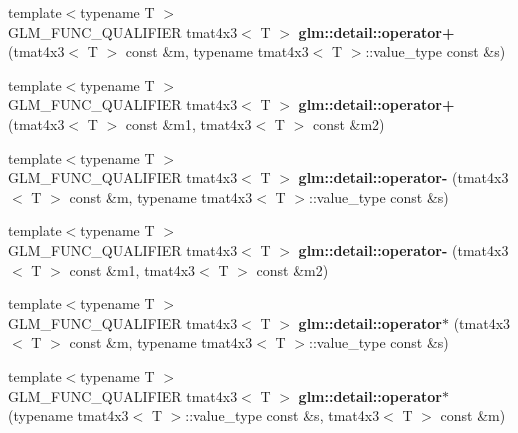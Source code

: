 \begin{DoxyCompactItemize}
\item 
\hypertarget{namespaceglm_1_1detail_a7254d84728b7156831f048a23e82ba5f}{{\footnotesize template$<$typename T $>$ }\\G\-L\-M\-\_\-\-F\-U\-N\-C\-\_\-\-Q\-U\-A\-L\-I\-F\-I\-E\-R tmat4x3$<$ T $>$ {\bfseries glm\-::detail\-::operator+} (tmat4x3$<$ T $>$ const \&m, typename tmat4x3$<$ T $>$\-::value\-\_\-type const \&s)}\label{namespaceglm_1_1detail_a7254d84728b7156831f048a23e82ba5f}

\item 
\hypertarget{namespaceglm_1_1detail_a7fc7624088b1bb5bf684a4dbc9ff79cf}{{\footnotesize template$<$typename T $>$ }\\G\-L\-M\-\_\-\-F\-U\-N\-C\-\_\-\-Q\-U\-A\-L\-I\-F\-I\-E\-R tmat4x3$<$ T $>$ {\bfseries glm\-::detail\-::operator+} (tmat4x3$<$ T $>$ const \&m1, tmat4x3$<$ T $>$ const \&m2)}\label{namespaceglm_1_1detail_a7fc7624088b1bb5bf684a4dbc9ff79cf}

\item 
\hypertarget{namespaceglm_1_1detail_a185d2953b132fd46f6c99f89a5d90ca5}{{\footnotesize template$<$typename T $>$ }\\G\-L\-M\-\_\-\-F\-U\-N\-C\-\_\-\-Q\-U\-A\-L\-I\-F\-I\-E\-R tmat4x3$<$ T $>$ {\bfseries glm\-::detail\-::operator-\/} (tmat4x3$<$ T $>$ const \&m, typename tmat4x3$<$ T $>$\-::value\-\_\-type const \&s)}\label{namespaceglm_1_1detail_a185d2953b132fd46f6c99f89a5d90ca5}

\item 
\hypertarget{namespaceglm_1_1detail_ab7c000595e2d011c003fa5419cc21a5d}{{\footnotesize template$<$typename T $>$ }\\G\-L\-M\-\_\-\-F\-U\-N\-C\-\_\-\-Q\-U\-A\-L\-I\-F\-I\-E\-R tmat4x3$<$ T $>$ {\bfseries glm\-::detail\-::operator-\/} (tmat4x3$<$ T $>$ const \&m1, tmat4x3$<$ T $>$ const \&m2)}\label{namespaceglm_1_1detail_ab7c000595e2d011c003fa5419cc21a5d}

\item 
\hypertarget{namespaceglm_1_1detail_a792efb5b12898b4ed8f5a9ea53af0f87}{{\footnotesize template$<$typename T $>$ }\\G\-L\-M\-\_\-\-F\-U\-N\-C\-\_\-\-Q\-U\-A\-L\-I\-F\-I\-E\-R tmat4x3$<$ T $>$ {\bfseries glm\-::detail\-::operator$\ast$} (tmat4x3$<$ T $>$ const \&m, typename tmat4x3$<$ T $>$\-::value\-\_\-type const \&s)}\label{namespaceglm_1_1detail_a792efb5b12898b4ed8f5a9ea53af0f87}

\item 
\hypertarget{namespaceglm_1_1detail_a38e83a6d2c3293639f02c3c830938d27}{{\footnotesize template$<$typename T $>$ }\\G\-L\-M\-\_\-\-F\-U\-N\-C\-\_\-\-Q\-U\-A\-L\-I\-F\-I\-E\-R tmat4x3$<$ T $>$ {\bfseries glm\-::detail\-::operator$\ast$} (typename tmat4x3$<$ T $>$\-::value\-\_\-type const \&s, tmat4x3$<$ T $>$ const \&m)}\label{namespaceglm_1_1detail_a38e83a6d2c3293639f02c3c830938d27}


\end{DoxyCompactItemize}
